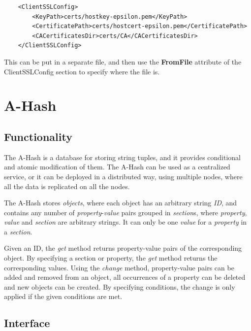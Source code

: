 \documentclass{book}
\begin{document}
\begin{verbatim}
    <ClientSSLConfig>
        <KeyPath>certs/hostkey-epsilon.pem</KeyPath>
        <CertificatePath>certs/hostcert-epsilon.pem</CertificatePath>
        <CACertificatesDir>certs/CA</CACertificatesDir>
    </ClientSSLConfig>
\end{verbatim}

This can be put in a separate file, and then use the \textbf{FromFile} attribute of the ClientSSLConfig section to specify where the file is.


\newpage

\section{A-Hash} %
\label{sec:a_hash}

\subsection{Functionality} %

The A-Hash is a database for storing string tuples, and it provides conditional and atomic modification of them. The A-Hash can be used as a centralized service, or it can be deployed in a distributed way, using multiple nodes, where all the data is replicated on all the nodes.

The A-Hash stores \emph{objects}, where each object has an arbitrary string \emph{ID}, and contains any number of \emph{property}-\emph{value} pairs grouped in \emph{section}s, where \emph{property}, \emph{value} and \emph{section} are arbitrary strings. It can only be one \emph{value} for a \emph{property} in a \emph{section}.

Given an ID, the \emph{get} method returns property-value pairs of the corresponding object. By specifying a section or property, the \emph{get} method returns the corresponding values. Using the \emph{change} method, property-value pairs can be added and removed from an object, all occurrences of a property can be deleted and new objects can be created. By specifying conditions, the change is only applied if the given conditions are met.


\subsection{Interface} %
\end{document}

